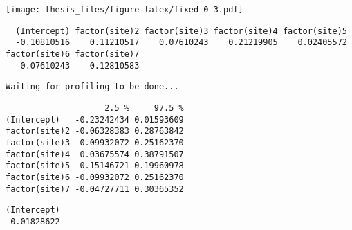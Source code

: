 \documentclass[12pt,twoside]{dukestatscithesis}
\theoremstyle{definition}
\theoremstyle{definition}
\theoremstyle{definition}
\theoremstyle{remark}
\begin{document}
\texttt{[image: thesis\_files/figure-latex/fixed 0-3.pdf]}
\begin{Shaded}
\begin{Highlighting}[]
\NormalTok{ =}\StringTok{ }\OperatorTok{~}\StringTok{ }

\NormalTok{)}
\end{Highlighting}
\end{Shaded}
\begin{verbatim}
  (Intercept) factor(site)2 factor(site)3 factor(site)4 factor(site)5 
  -0.10810516    0.11210517    0.07610243    0.21219905    0.02405572 
factor(site)6 factor(site)7 
   0.07610243    0.12810583 
\end{verbatim}
\begin{Shaded}
\begin{Highlighting}[]
\NormalTok{)}
\end{Highlighting}
\end{Shaded}
\begin{verbatim}
Waiting for profiling to be done...
\end{verbatim}
\begin{verbatim}
                    2.5 %     97.5 %
(Intercept)   -0.23242434 0.01593609
factor(site)2 -0.06328383 0.28763842
factor(site)3 -0.09932072 0.25162370
factor(site)4  0.03675574 0.38791507
factor(site)5 -0.15146721 0.19960978
factor(site)6 -0.09932072 0.25162370
factor(site)7 -0.04727711 0.30365352
\end{verbatim}
\begin{Shaded}
\begin{Highlighting}[]
\StringTok{ }\OperatorTok{~}\StringTok{ }\NormalTok{, }
\end{Highlighting}
\end{Shaded}
\begin{verbatim}
(Intercept) 
-0.01828622 
\end{verbatim}
\end{document}
